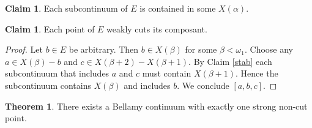 \documentclass[12pt]{article}
\theoremstyle{plain}
\theoremstyle{definition}
\newcounter{dummy}
\newtheorem{thm}[dummy]{Theorem}
\newcounter{dummy4}
\newcounter{ClaimCounter}
\newtheorem{claim}[ClaimCounter]{Claim}
\newcounter{dummy3}
\newcounter{dummy5}
\newcounter{claim5counter}
\newcounter{dummy6}
\newcommand{\A}{\ensuremath{\alpha}}
\newcommand{\B}{\ensuremath{\beta}}
\newcommand{\W}{\ensuremath{\omega}}
\newcommand{\0}{\ensuremath{\varnothing}}
\begin{document}
	\begin{claim}\label{ec}
		Each subcontinuum of $E$ is contained in some $X(\A)$.
	\end{claim}
	
	\begin{claim}\label{trivcut}
		Each point of $E$ weakly cuts its composant.
	\end{claim}
	
	\begin{proof}
		Let $b \in E$ be arbitrary.
		Then $b \in X(\B)$ for some $\B < \W_1$.
		Choose any $a \in X(\B) - b$ and $c \in X(\B+2) - X(\B+1)$.
		By Claim \ref{stab} each subcontinuum that includes $a$ and $c$ must contain $X(\B+1)$.
		Hence the subcontinuum contains $X(\B)$ and includes $b$.
		We conclude $[a,b,c]$.
	\end{proof}
	
	
	\begin{thm}
		There exists a Bellamy continuum with exactly one strong non-cut point.
	\end{thm}
	
\end{document}
